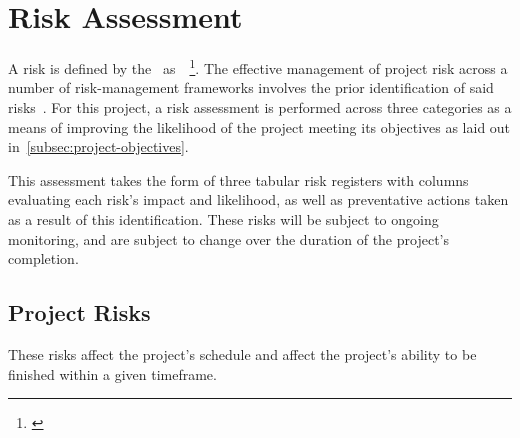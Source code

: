 
\thispagestyle{plain}
\newpage
\section{Risk Assessment}\label{sec:risk-assessment}

\normalsize

A risk is defined by the~\citet{pmi_2021} as~~\footnote{\citep{pmi_2021}}.
The effective management of project risk across a number of risk-management frameworks involves the prior identification of said risks~\citep{goman_risk}.
For this project, a risk assessment is performed across three categories as a means of improving the likelihood of the project meeting its objectives as laid out in~\ref{subsec:project-objectives}.

This assessment takes the form of three tabular risk registers with columns evaluating each risk's impact and likelihood, as well as preventative actions taken as a result of this identification.
These risks will be subject to ongoing monitoring, and are subject to change over the duration of the project's completion.

\subsection{Project Risks}\label{subsec:project-risks}

These risks affect the project’s schedule and affect the project’s ability to be finished within a given timeframe.


